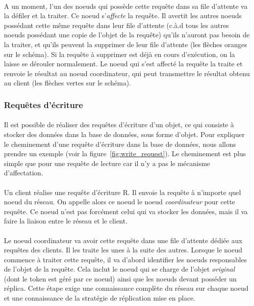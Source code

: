 \documentclass[12pt]{article}
\begin{document}
\paragraph{} A un moment, l'un des noeuds qui possède cette requête dans sa file d'attente va la défiler et la traiter. Ce noeud s'\textit{affecte} la requête. Il avertit les autres noeuds possédant cette même requête dans leur file d'attente (c.à.d tous les autres noeuds possédant une copie de l'objet de la requête) qu'ils n'auront pas besoin de la traiter, et qu'ils peuvent la supprimer de leur file d'attente (les flèches oranges sur le schéma). Si la requête à supprimer est déjà en cours d'exécution, on la laisse se dérouler normalement. Le noeud qui s'est affecté la requête la traite et renvoie le résultat au noeud coordinateur, qui peut transmettre le résultat obtenu au client (les flèches vertes sur le schéma).

\subsubsection{Requêtes d'écriture}

\paragraph{} Il est possible de réaliser des requêtes d'écriture d'un objet, ce qui consiste à stocker des données dans la base de données, sous forme d'objet.  Pour expliquer le cheminement d'une requête d'écriture dans la base de données, nous allons prendre un exemple (voir la figure~\ref{fig:write_request}). Le cheminement est plus simple que pour une requête de lecture car il n'y a pas le mécanisme d'affectation.

\paragraph{} Un client réalise une requête d'écriture R. Il envoie la requête à n'importe quel noeud du réseau. On appelle alors ce noeud le noeud \textit{coordinateur} pour cette requête. Ce noeud n'est pas forcément celui qui va stocker les données, mais il va faire la liaison entre le réseau et le client.

\paragraph{} Le noeud coordinateur va avoir cette requête dans une file d'attente dédiée aux requêtes des clients. Il les traite les unes à la suite des autres. Lorsque le noeud commence à traiter cette requête, il va d'abord identifier les noeuds responsables de l'objet de la requête. Cela inclut le noeud qui se charge de l'objet \textit{original} (dont le token est géré par ce noeud) ainsi que les noeuds devant posséder un réplica. Cette étape exige une connaissance complète du réseau sur chaque noeud et une connaissance de la stratégie de réplication mise en place.
\end{document}

